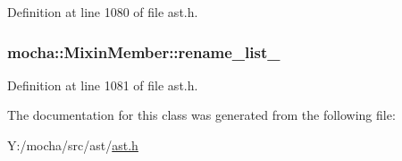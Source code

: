 Definition at line 1080 of file ast.h.

\hypertarget{classmocha_1_1_mixin_member_a88dac37c5197e1e2b94fdf7a98e8a516}{
\subsubsection[{rename\_\-list\_\-}]{ {\bf mocha::MixinMember::rename\_\-list\_\-}}}
\label{classmocha_1_1_mixin_member_a88dac37c5197e1e2b94fdf7a98e8a516}


Definition at line 1081 of file ast.h.



The documentation for this class was generated from the following file:\begin{DoxyCompactItemize}
\item 
Y:/mocha/src/ast/\hyperlink{ast_8h}{ast.h}\end{DoxyCompactItemize}
